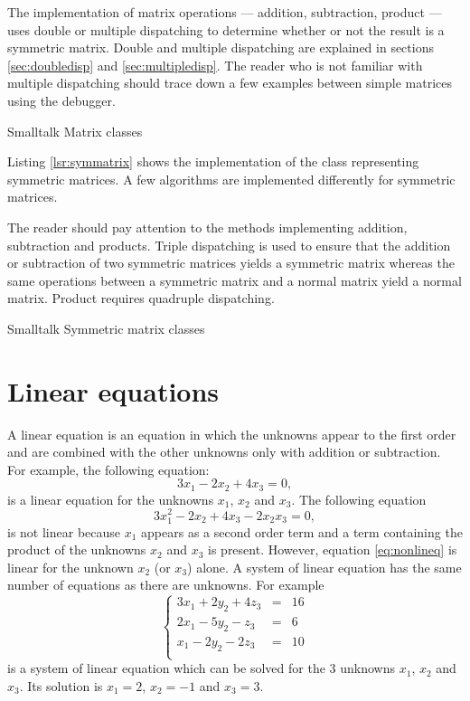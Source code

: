 The implementation of matrix operations --- addition, subtraction,
product --- uses double or multiple dispatching to determine
whether or not the result is a symmetric matrix. Double and
multiple dispatching are explained in sections
\ref{sec:doubledisp} and \ref{sec:multipledisp}. The reader who is
not familiar with multiple dispatching should trace down a few
examples between simple matrices using the debugger.


\begin{listing}[label=lst:matrix]{Smalltalk}
{Matrix classes}
%
\end{listing}

Listing \ref{lsr:symmatrix} shows the implementation of the class
 representing symmetric matrices. A few
algorithms are implemented differently for symmetric matrices.

The reader should pay attention to the methods implementing
addition, subtraction and products. Triple dispatching is used to
ensure that the addition or subtraction of two symmetric matrices
yields a symmetric matrix whereas the same operations between a
symmetric matrix and a normal matrix yield a normal matrix.
Product requires quadruple dispatching.

\begin{listing}[label=lst:symatrix]{Smalltalk}
{Symmetric matrix classes}
%
\end{listing}

\section{Linear equations}
\label{sec:lineqs} A linear equation is an equation in which the
unknowns appear to the first order and are combined with the other
unknowns only with addition or subtraction. For example, the
following equation:
\begin{equation}
  3x_1-2x_2+4x_3=0,
\end{equation}
is a linear equation for the unknowns $x_1$, $x_2$ and $x_3$. The
following equation
\begin{equation}
\label{eq:nonlineq}
  3x_1^2-2x_2+4x_3 - 2 x_2 x_3=0,
\end{equation}
is not linear because $x_1$ appears as a second order term and a
term containing the product of the unknowns $x_2$ and $x_3$ is
present. However, equation \ref{eq:nonlineq} is linear for the
unknown $x_2$ (or $x_3$) alone. A system of linear equation has
the same number of equations as there are unknowns. For example
\begin{equation}
\label{eq:lineqex}
  \left\{
  \begin{array}{lcr}
  3x_1+2y_2+4z_3&=&16\\
  2x_1-5y_2-z_3&=&6\\
  x_1-2y_2-2z_3&=&10\\
\end{array}\right.
\end{equation}
is a system of linear equation which can be solved for the 3
unknowns $x_1$, $x_2$ and $x_3$. Its solution is $x_1=2$, $x_2=-1$
and $x_3=3$.

